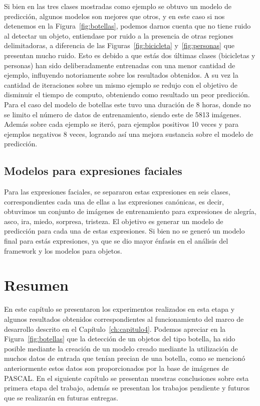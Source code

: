 Si bien en las tres clases mostradas como ejemplo se obtuvo un modelo de predicción, algunos modelos son mejores que otros, y en este caso si nos detenemos en la Figura~\ref{fig:botellas}, podemos darnos cuenta que no tiene ruido al detectar un objeto, entiendase por ruido a la presencia de otras regiones delimitadoras, a diferencia de las Figuras~\ref{fig:bicicleta} y~\ref{fig:personas} que presentan mucho ruido. Esto es debido a que estás dos últimas clases (bicicletas y personas) han sido deliberadamente entrenadas con una menor cantidad de ejemplo, influyendo notoriamente sobre los resultados obtenidos. A su vez la cantidad de iteraciones sobre un mismo ejemplo se redujo con el objetivo de disminuir el tiempo de computo, obteniendo como resultado un peor predicción. Para el caso del modelo de botellas este tuvo una duración de 8 horas, donde no se limito el número de datos de entrenamiento, siendo este de 5813 imágenes. Además sobre cada ejemplo se iteró, para ejemplos positivos 10 veces y para ejemplos negativos 8 veces, logrando así una mejora sustancia sobre el modelo de predicción.

\subsection{Modelos para expresiones faciales}\label{subsec:m_face}
Para las expresiones faciales, se separaron estas expresiones en seis clases, correspondientes cada una de ellas a las expresiones canónicas, es decir, obtuvimos un conjunto de imágenes de entrenamiento para expresiones de alegría, asco, ira, miedo, sorpresa, tristeza. El objetivo es generar un modelo de predicción para cada una de estas expresiones. Si bien no se generó un modelo final para estás expresiones, ya que se dio mayor énfasis en el análisis del framework y los modelos para objetos. 

\section{Resumen}
En este capítulo se presentaron los experimentos realizados en esta etapa y algunos resultados obtenidos correspondientes al funcionamiento del marco de desarrollo descrito en el Capítulo~\ref{ch:capitulo4}. Podemos apreciar en la Figura~\ref{fig:botellas} que la detección de un objetos del tipo botella, ha sido posible mediante la creación de un modelo creado mediante la utilización de muchos datos de entrada que tenían precian de una botella, como se mencionó anteriormente estos datos son proporcionados por la base de imágenes de PASCAL. En el siguiente capítulo se presentan nuestras conclusiones sobre esta primera etapa del trabajo, además se presentan los trabajos pendiente y futuros que se realizarán en futuras entregas.


